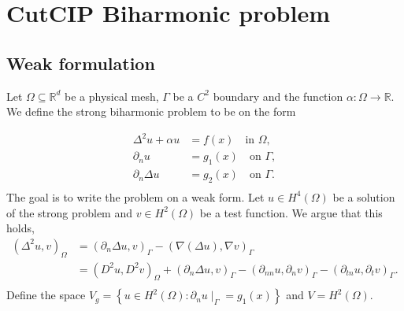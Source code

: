 
\newpage
\section{CutCIP Biharmonic problem}%
\label{sec:cutcip_biharmonic_problem}

\subsection{Weak formulation}%
\label{sub:weak_formulation}


Let $\Omega \subseteq    \mathbb{R} ^d$ be a physical mesh, $\Gamma  $ be a $C^2$ boundary and the function $\alpha: \Omega \to \mathbb{R}  $. We define the strong biharmonic problem to be on the form

\begin{equation}
\begin{split}
    \Delta^2  u  + \alpha  u  & = f( x)  \quad \text{in } \Omega,   \\
    \partial _{n} u & = g_{1}(x)   \quad \text{on } \Gamma ,  \\
    \partial _{n} \Delta  u & = g_2(x)  \quad \text{on } \Gamma  .  \\
\end{split}
\end{equation}
The goal is to write the problem on a weak form.
Let $u \in H^{4}( \Omega ) $ be a solution of the strong problem and $v \in H^{2}( \Omega ) $ be a test function. We argue that this holds,
    \[
        \begin{split}
(\Delta ^2u,v )_{\Omega } & = ( \partial _{n} \Delta u, v)_{\Gamma } - ( \nabla ( \Delta u) , \nabla v) _{\Gamma } \\
&= ( D^2u, D^2v)_{\Omega } + ( \partial _{n} \Delta u ,v)_{\Gamma } - ( \partial _{nn} u, \partial _{n}v)_{\Gamma } - ( \partial _{tn} u, \partial _{t} v)_{\Gamma }.        \\
        \end{split}
    \]
    Define the space $V_{g} = \left\{ u \in H^{2}( \Omega ) :  \partial _{n}u  \mid _{\Gamma } = g_1(x )  \right \} $ and $V = H^2( \Omega ) $.
